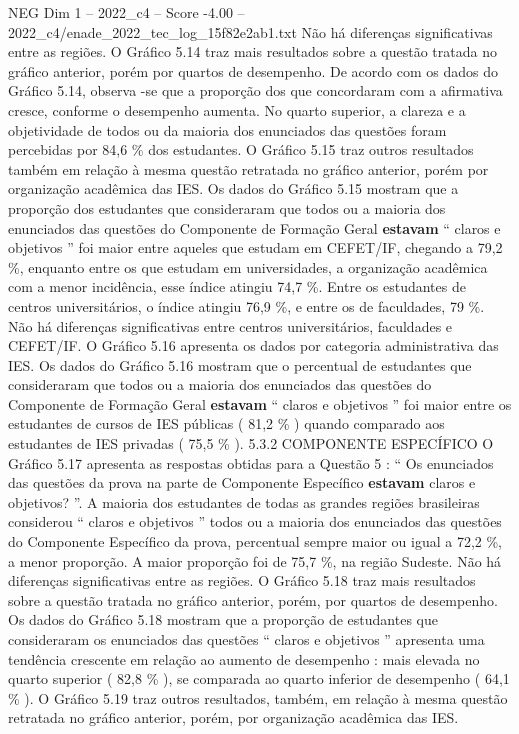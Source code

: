 \begin{textsample}{NEG Dim 1 – 2022\_c4 – Score -4.00 – 2022\_c4/enade\_2022\_tec\_log\_15f82e2ab1.txt}
Não há diferenças significativas entre as regiões.
O Gráfico 5.14 traz mais resultados sobre a questão tratada no gráfico anterior, porém por quartos de desempenho.
De acordo com os dados do Gráfico 5.14, observa -se que a proporção dos que concordaram com a afirmativa cresce, conforme o desempenho aumenta.
No quarto superior, a clareza e a objetividade de todos ou da maioria dos enunciados das questões foram percebidas por 84,6 \% dos estudantes.
O Gráfico 5.15 traz outros resultados também em relação à mesma questão retratada no gráfico anterior, porém por organização acadêmica das IES.
Os dados do Gráfico 5.15 mostram que a proporção dos estudantes que consideraram que todos ou a maioria dos enunciados das questões do Componente de Formação Geral \textbf{estavam} “ claros e objetivos ” foi maior entre aqueles que estudam em CEFET/IF, chegando a 79,2 \%, enquanto entre os que estudam em universidades, a organização acadêmica com a menor incidência, esse índice atingiu 74,7 \%.
Entre os estudantes de centros universitários, o índice atingiu 76,9 \%, e entre os de faculdades, 79 \%.
Não há diferenças significativas entre centros universitários, faculdades e CEFET/IF.
O Gráfico 5.16 apresenta os dados por categoria administrativa das IES.
Os dados do Gráfico 5.16 mostram que o percentual de estudantes que consideraram que todos ou a maioria dos enunciados das questões do Componente de Formação Geral \textbf{estavam} “ claros e objetivos ” foi maior entre os estudantes de cursos de IES públicas ( 81,2 \% ) quando comparado aos estudantes de IES privadas ( 75,5 \% ). 5.3.2 COMPONENTE ESPECÍFICO O Gráfico 5.17 apresenta as respostas obtidas para a Questão 5 : “ Os enunciados das questões da prova na parte de Componente Específico \textbf{estavam} claros e objetivos? ”.
A maioria dos estudantes de todas as grandes regiões brasileiras considerou “ claros e objetivos ” todos ou a maioria dos enunciados das questões do Componente Específico da prova, percentual sempre maior ou igual a 72,2 \%, a menor proporção.
A maior proporção foi de 75,7 \%, na região Sudeste.
Não há diferenças significativas entre as regiões.
O Gráfico 5.18 traz mais resultados sobre a questão tratada no gráfico anterior, porém, por quartos de desempenho.
Os dados do Gráfico 5.18 mostram que a proporção de estudantes que consideraram os enunciados das questões “ claros e objetivos ” apresenta uma tendência crescente em relação ao aumento de desempenho : mais elevada no quarto superior ( 82,8 \% ), se comparada ao quarto inferior de desempenho ( 64,1 \% ).
O Gráfico 5.19 traz outros resultados, também, em relação à mesma questão retratada no gráfico anterior, porém, por organização acadêmica das IES.

\end{textsample}
